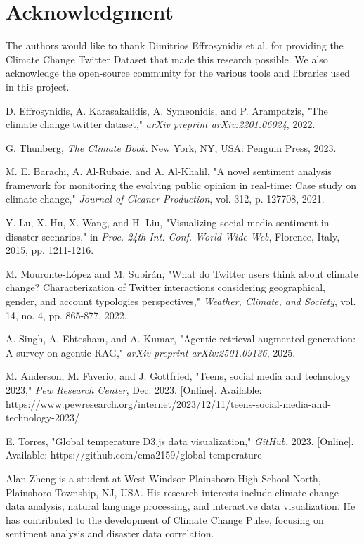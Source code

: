 \documentclass{ieeeaccess}
\begin{document}
\section*{Acknowledgment}
The authors would like to thank Dimitrios Effrosynidis et al. for providing the Climate Change Twitter Dataset that made this research possible. We also acknowledge the open-source community for the various tools and libraries used in this project.

\begin{thebibliography}{00}

 D. Effrosynidis, A. Karasakalidis, A. Symeonidis, and P. Arampatzis, "The climate change twitter dataset," \emph{arXiv preprint arXiv:2201.06024}, 2022.

 G. Thunberg, \emph{The Climate Book}. New York, NY, USA: Penguin Press, 2023.

 M. E. Barachi, A. Al-Rubaie, and A. Al-Khalil, "A novel sentiment analysis framework for monitoring the evolving public opinion in real-time: Case study on climate change," \emph{Journal of Cleaner Production}, vol. 312, p. 127708, 2021.

 Y. Lu, X. Hu, X. Wang, and H. Liu, "Visualizing social media sentiment in disaster scenarios," in \emph{Proc. 24th Int. Conf. World Wide Web}, Florence, Italy, 2015, pp. 1211-1216.

 M. Mouronte-López and M. Subirán, "What do Twitter users think about climate change? Characterization of Twitter interactions considering geographical, gender, and account typologies perspectives," \emph{Weather, Climate, and Society}, vol. 14, no. 4, pp. 865-877, 2022.

 A. Singh, A. Ehtesham, and A. Kumar, "Agentic retrieval-augmented generation: A survey on agentic RAG," \emph{arXiv preprint arXiv:2501.09136}, 2025.

 M. Anderson, M. Faverio, and J. Gottfried, "Teens, social media and technology 2023," \emph{Pew Research Center}, Dec. 2023. [Online]. Available: https://www.pewresearch.org/internet/2023/12/11/teens-social-media-and-technology-2023/

 E. Torres, "Global temperature D3.js data visualization," \emph{GitHub}, 2023. [Online]. Available: https://github.com/ema2159/global-temperature

\end{thebibliography}

\begin{IEEEbiographynophoto}{Alan Zheng} is a student at West-Windsor Plainsboro High School North, Plainsboro Township, NJ, USA. His research interests include climate change data analysis, natural language processing, and interactive data visualization. He has contributed to the development of Climate Change Pulse, focusing on sentiment analysis and disaster data correlation.
\end{IEEEbiographynophoto}
\end{document}
